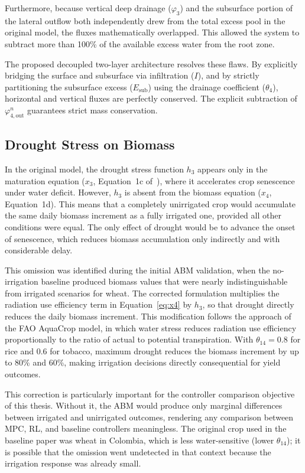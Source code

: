 Furthermore, because vertical deep drainage ($\varphi_3$) and the subsurface portion of the lateral outflow both independently drew from the total excess pool in the original model, the fluxes mathematically overlapped. This allowed the system to subtract more than 100\% of the available excess water from the root zone.

The proposed decoupled two-layer architecture resolves these flaws. By explicitly bridging the surface and subsurface via infiltration ($I$), and by strictly partitioning the subsurface excess ($E_{\text{sub}}$) using the drainage coefficient ($\theta_4$), horizontal and vertical fluxes are perfectly conserved. The explicit subtraction of $\varphi_{4,\text{out}}^n$ guarantees strict mass conservation.

\subsection{Drought Stress on Biomass}

In the original model, the drought stress function $h_3$ appears only in the maturation equation ($x_3$, Equation~1c of~\cite{Lopezjimenez2024}), where it accelerates crop senescence under water deficit. However, $h_3$ is absent from the biomass equation ($x_4$, Equation~1d). This means that a completely unirrigated crop would accumulate the same daily biomass increment as a fully irrigated one, provided all other conditions were equal. The only effect of drought would be to advance the onset of senescence, which reduces biomass accumulation only indirectly and with considerable delay.

This omission was identified during the initial ABM validation, when the no-irrigation baseline produced biomass values that were nearly indistinguishable from irrigated scenarios for wheat. The corrected formulation multiplies the radiation use efficiency term in Equation~\eqref{eq:x4} by $h_3$, so that drought directly reduces the daily biomass increment. This modification follows the approach of the FAO AquaCrop model, in which water stress reduces radiation use efficiency proportionally to the ratio of actual to potential transpiration. With $\theta_{14} = 0.8$ for rice and 0.6 for tobacco, maximum drought reduces the biomass increment by up to 80\% and 60\%, making irrigation decisions directly consequential for yield outcomes.

This correction is particularly important for the controller comparison objective of this thesis. Without it, the ABM would produce only marginal differences between irrigated and unirrigated outcomes, rendering any comparison between MPC, RL, and baseline controllers meaningless. The original crop used in the baseline paper was wheat in Colombia, which is less water-sensitive (lower $\theta_{14}$); it is possible that the omission went undetected in that context because the irrigation response was already small.


